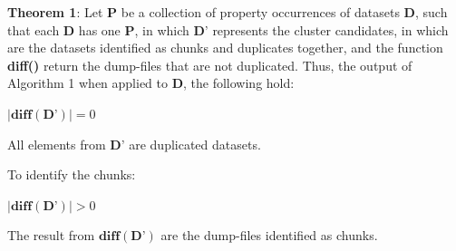 \textbf{Theorem 1}: Let $\mathbf{P}$ be a collection of property occurrences of datasets $\mathbf{D}$, such that each $\mathbf{D}$ has one $\mathbf{P}$, in which $\mathbf{D’}$ represents the cluster candidates, in which are the datasets identified as chunks and duplicates together, and the function \textbf{diff()} return the dump-files that are not duplicated. Thus, the output of Algorithm 1 when applied to $\mathbf{D}$, the following hold:

$|\textbf{diff}(\mathbf{D’})| = 0$

All elements from $\mathbf{D’}$ are duplicated datasets.


To identify the chunks:

$|\textbf{diff}(\mathbf{D’})| > 0$


The result from $\textbf{diff}(\mathbf{D’})$ are the dump-files identified as chunks.







